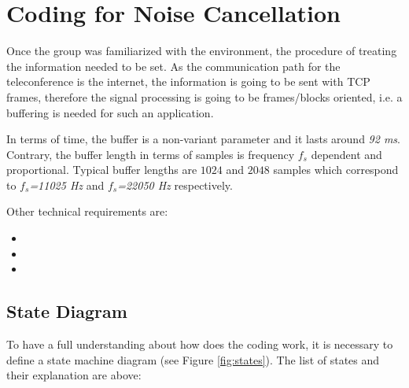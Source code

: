 \documentclass[11pt,a4paper,english]{book}  %
\theoremstyle{definition}  %
\theoremstyle{plain}  %
\theoremstyle{remark}  %
\begin{document}
\section{Coding for Noise Cancellation}
\label{sec:coding}

Once the group was familiarized with the environment, the procedure of treating the information needed to be set. As the communication path for the teleconference is the internet, the information is going to be sent with TCP frames, therefore the signal processing is going to be frames/blocks oriented, i.e. a buffering is needed for such an application.

In terms of time, the buffer is a non-variant parameter and it lasts around \textit{92 ms}. Contrary, the buffer length in terms of samples is frequency $f_{s}$ dependent and proportional. Typical buffer lengths are $1024$ and $2048$ samples which correspond to \textit{$f_{s}$=11025 Hz} and \textit{$f_{s}$=22050 Hz} respectively.

Other technical requirements are:

\begin{itemize}
\item
\item
\item
\end{itemize}


	\subsection{State Diagram}
	
	To have a full understanding about how does the coding work, it is necessary to define a state machine diagram (see Figure \ref{fig:states}). The list of states and their explanation are above:
	
\end{document}
